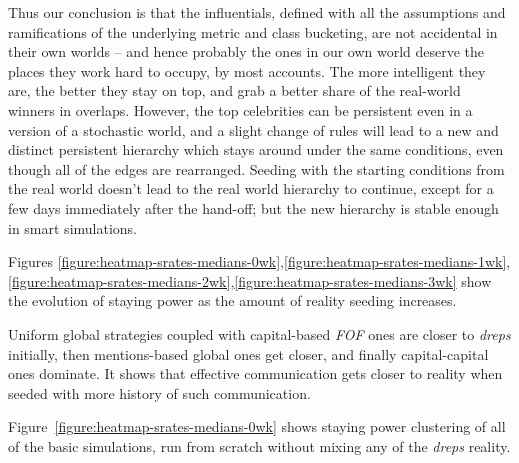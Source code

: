 \documentclass[10pt,oneside]{memoir}
\begin{document}
Thus our conclusion is that the influentials, defined with all the assumptions and ramifications of the underlying metric and class bucketing, are not accidental in their own worlds -- and hence probably the ones in our own world deserve the places they work hard to occupy, by most accounts.  The more intelligent they are, the better they stay on top, and grab a better share of the real-world winners in overlaps.  However, the top celebrities can be persistent even in a version of a stochastic world, and a slight change of rules will lead to a new and distinct persistent hierarchy which stays around under the same conditions, even though all of the edges are rearranged.  Seeding with the starting conditions from the real world doesn't lead to the real world hierarchy to continue, except for a few days immediately after the hand-off; but the new hierarchy is stable enough in smart simulations.


Figures \ref{figure:heatmap-srates-medians-0wk},\ref{figure:heatmap-srates-medians-1wk},\ref{figure:heatmap-srates-medians-2wk},\ref{figure:heatmap-srates-medians-3wk} show the evolution of staying power as the amount of reality seeding increases.  


Uniform global strategies coupled with capital-based {\itshape FOF} ones are closer to {\itshape dreps} initially, then mentions-based global ones get closer, and finally capital-capital ones dominate.  It shows that effective communication gets closer to reality when seeded with more history of such communication.


Figure~\ref{figure:heatmap-srates-medians-0wk} shows staying power clustering of all of the basic simulations, run from scratch without mixing any of the {\itshape dreps} reality.
\end{document}

